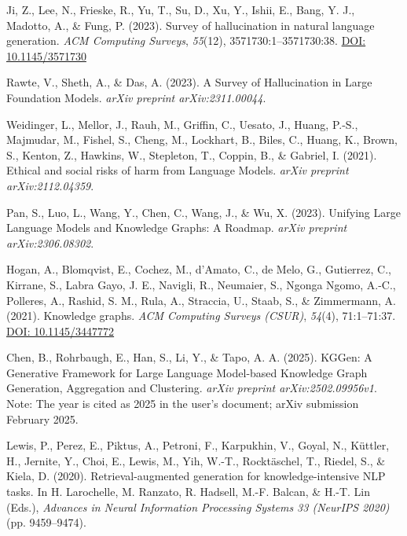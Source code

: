 \documentclass{article}
\begin{document}
\begin{thebibliography}{99}

Ji, Z., Lee, N., Frieske, R., Yu, T., Su, D., Xu, Y., Ishii, E., Bang, Y. J., Madotto, A., \& Fung, P. (2023).
Survey of hallucination in natural language generation.
\textit{ACM Computing Surveys}, \textit{55}(12), 3571730:1--3571730:38.
\href{https://doi.org/10.1145/3571730}{DOI: 10.1145/3571730}

Rawte, V., Sheth, A., \& Das, A. (2023).
A Survey of Hallucination in Large Foundation Models.
\textit{arXiv preprint arXiv:2311.00044}.

Weidinger, L., Mellor, J., Rauh, M., Griffin, C., Uesato, J., Huang, P.-S., Majmudar, M., Fishel, S., Cheng, M., Lockhart, B., Biles, C., Huang, K., Brown, S., Kenton, Z., Hawkins, W., Stepleton, T., Coppin, B., \& Gabriel, I. (2021).
Ethical and social risks of harm from Language Models.
\textit{arXiv preprint arXiv:2112.04359}.

Pan, S., Luo, L., Wang, Y., Chen, C., Wang, J., \& Wu, X. (2023).
Unifying Large Language Models and Knowledge Graphs: A Roadmap.
\textit{arXiv preprint arXiv:2306.08302}.

Hogan, A., Blomqvist, E., Cochez, M., d'Amato, C., de Melo, G., Gutierrez, C., Kirrane, S., Labra Gayo, J. E., Navigli, R., Neumaier, S., Ngonga Ngomo, A.-C., Polleres, A., Rashid, S. M., Rula, A., Straccia, U., Staab, S., \& Zimmermann, A. (2021).
Knowledge graphs.
\textit{ACM Computing Surveys (CSUR)}, \textit{54}(4), 71:1--71:37.
\href{https://doi.org/10.1145/3447772}{DOI: 10.1145/3447772}

Chen, B., Rohrbaugh, E., Han, S., Li, Y., \& Tapo, A. A. (2025).
{KGGen}: A Generative Framework for Large Language Model-based Knowledge Graph Generation, Aggregation and Clustering.
\textit{arXiv preprint arXiv:2502.09956v1}.
Note: The year is cited as 2025 in the user's document; arXiv submission February 2025.

Lewis, P., Perez, E., Piktus, A., Petroni, F., Karpukhin, V., Goyal, N., K{\"u}ttler, H., Jernite, Y., Choi, E., Lewis, M., Yih, W.-T., Rockt{\"a}schel, T., Riedel, S., \& Kiela, D. (2020).
Retrieval-augmented generation for knowledge-intensive NLP tasks.
In H. Larochelle, M. Ranzato, R. Hadsell, M.-F. Balcan, \& H.-T. Lin (Eds.), \textit{Advances in Neural Information Processing Systems 33 (NeurIPS 2020)} (pp. 9459--9474).


\end{thebibliography}
\end{document}
